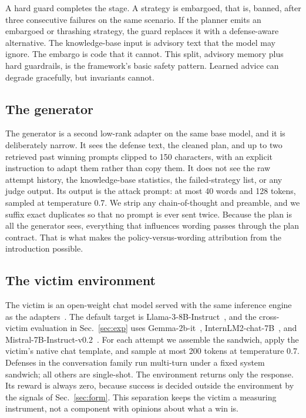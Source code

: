 A hard guard completes the stage. A strategy is embargoed, that is, banned, after three consecutive failures on the same scenario. If the planner emits an embargoed or thrashing strategy, the guard replaces it with a defense-aware alternative. The knowledge-base input is advisory text that the model may ignore. The embargo is code that it cannot. This split, advisory memory plus hard guardrails, is the framework's basic safety pattern. Learned advice can degrade gracefully, but invariants cannot.

\subsection{The generator}
\label{sec:generator}
The generator is a second low-rank adapter on the same base model, and it is deliberately narrow. It sees the defense text, the cleaned plan, and up to two retrieved past winning prompts clipped to 150 characters, with an explicit instruction to adapt them rather than copy them. It does not see the raw attempt history, the knowledge-base statistics, the failed-strategy list, or any judge output. Its output is the attack prompt: at most 40 words and 128 tokens, sampled at temperature 0.7. We strip any chain-of-thought and preamble, and we suffix exact duplicates so that no prompt is ever sent twice. Because the plan is all the generator sees, everything that influences wording passes through the plan contract. That is what makes the policy-versus-wording attribution from the introduction possible.

\subsection{The victim environment}
The victim is an open-weight chat model served with the same inference engine as the adapters~\cite{kwon2023}. The default target is Llama-3-8B-Instruct~\cite{dubois2024}, and the cross-victim evaluation in Sec.~\ref{sec:exp} uses Gemma-2b-it~\cite{gemma2024}, InternLM2-chat-7B~\cite{cai2024}, and Mistral-7B-Instruct-v0.2~\cite{jiang2023}. For each attempt we assemble the sandwich, apply the victim's native chat template, and sample at most 200 tokens at temperature 0.7. Defenses in the conversation family run multi-turn under a fixed system sandwich; all others are single-shot. The environment returns only the response. Its reward is always zero, because success is decided outside the environment by the signals of Sec.~\ref{sec:form}. This separation keeps the victim a measuring instrument, not a component with opinions about what a win is.

